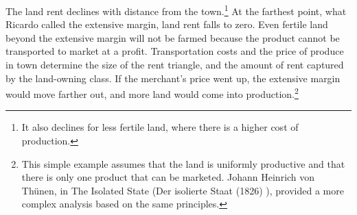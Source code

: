 The land rent %
declines with distance from the town.\footnote{It also declines for less fertile land, where there is a higher cost of production.} 
At the farthest point, what Ricardo called the extensive margin, land rent falls to zero. Even fertile land beyond the extensive margin will not be farmed because the product cannot be transported to market at a profit. Transportation costs and the price of produce in town determine the size of the  rent triangle, and the amount of rent captured by the land-owning class. %
If the merchant's price went up, the \gls{extensive margin} would move farther out, and more land would come into production.\footnote{This simple example assumes that the land is uniformly productive and that there is only one product that can be marketed. Johann Heinrich von Th\"unen, in The Isolated State (Der isolierte Staat (1826) \cite{vonthunenIsolirteStaatBeziehung1826}), provided a more complex analysis based on the same principles.}

